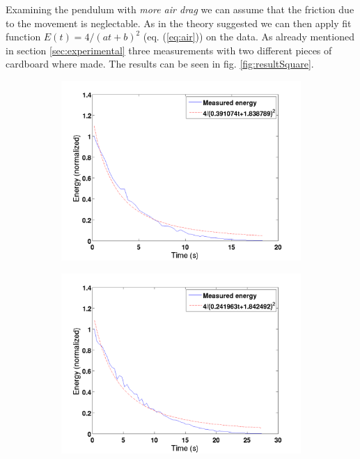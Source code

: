 Examining the pendulum with \emph{more air drag} we can assume that the friction due to the movement is neglectable. As in the theory suggested we can then apply fit function $ E(t)=4/\left(a t + b\right)^2$ (eq. (\ref{eq:air})) on the data. As already mentioned in section \ref{sec:experimental} three measurements with two different pieces of cardboard where made.  The results can be seen in fig. \ref{fig:resultSquare}.
\begin{figure}[htbp]
\centering
\begin{subfigure}{.45\textwidth}
	\centering
	\includegraphics[width=\textwidth]{img/resultSquare1}
	\caption{}
	\label{fig:resultSquare1}
\end{subfigure}
\begin{subfigure}{.45\textwidth}
	\centering
	\includegraphics[width=\textwidth]{img/resultSquare2}

\end{subfigure}
\end{figure}
